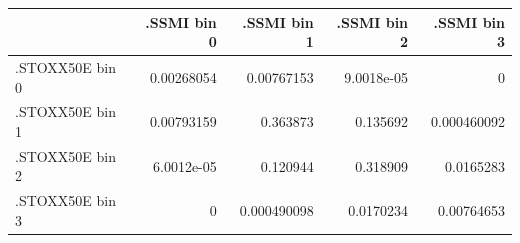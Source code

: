 \begin{tabular}{lrrrr}
\toprule
 & .SSMI bin 0 & .SSMI bin 1 & .SSMI bin 2 & .SSMI bin 3 \\
\midrule
.STOXX50E bin 0 & 0.00268054 & 0.00767153 & 9.0018e-05 & 0 \\
.STOXX50E bin 1 & 0.00793159 & 0.363873 & 0.135692 & 0.000460092 \\
.STOXX50E bin 2 & 6.0012e-05 & 0.120944 & 0.318909 & 0.0165283 \\
.STOXX50E bin 3 & 0 & 0.000490098 & 0.0170234 & 0.00764653 \\
\bottomrule
\end{tabular}
